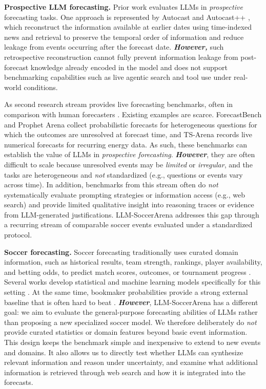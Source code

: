 \documentclass[sigconf,nonacm]{acmart}
\newcommand{\arena}{\mbox{LLM-SoccerArena}\xspace}
\begin{document}
\textbf{Prospective LLM forecasting.}
Prior work evaluates LLMs in \emph{prospective} forecasting tasks. One approach is represented by Autocast \citep{autocast} and Autocast++ \citep{autocastpp}, which reconstruct the information available at earlier dates using time-indexed news and retrieval to preserve the temporal order of information and reduce leakage from events occurring after the forecast date. \emph{\textbf{However,}} such retrospective reconstruction cannot fully prevent information leakage from post-forecast knowledge already encoded in the model and does not support benchmarking capabilities such as live agentic search and tool use under real-world conditions.

As second research stream provides live forecasting benchmarks, often in comparison with human forecasters \citep{halawi_etal_2024,pratt_etal_2024,hsieh_etal_2024}. Existing examples are scarce. ForecastBench \cite{forecastbench} and Prophet Arena  \citep{prophetarena} collect probabilistic forecasts for heterogeneous questions for which the outcomes are unresolved at forecast time, and TS-Arena \citep{tsarena} records live numerical forecasts for recurring energy data. As such, these benchmarks can establish the value of LLMs in \emph{prospective forecasting}. \textbf{\emph{However}}, they are often difficult to scale because unresolved events may be \emph{limited} or \emph{irregular}, and the tasks are heterogeneous and \emph{not} standardized (e.g., questions or events vary across time). In addition, benchmarks from this stream often do \emph{not} systematically evaluate prompting strategies or information access (e.g., web search) and provide limited qualitative insight into reasoning traces or evidence from LLM-generated justifications. \arena addresses this gap through a recurring stream of comparable soccer events evaluated under a standardized protocol.

\textbf{Soccer forecasting.}
Soccer forecasting traditionally uses curated domain information, such as historical results, team strength, rankings, player availability, and betting odds, to predict match scores, outcomes, or tournament progress \citep{maher_1982,dixon_coles_1997,groll_etal_2015,ley_etal_2019,zeileis_etal_2018}. Several works develop statistical and machine learning models specifically for this setting \cite{bunkerMachineLearningSoccer2024, rico-gonzalezMachineLearningApplication2022}. At the same time, bookmaker probabilities provide a strong external baseline that is often hard to beat \citep{leitner_etal_2010,sportsprediction}. \textbf{\emph{However}}, \arena has a different goal: we aim to evaluate the general-purpose forecasting abilities of LLMs rather than proposing a new specialized soccer model. We therefore deliberately do \emph{not} provide curated statistics or domain features beyond basic event information. This design keeps the benchmark simple and inexpensive to extend to new events and domains. It also allows us to directly test whether LLMs can synthesize relevant information and reason under uncertainty, and examine what additional information is retrieved through web search and how it is integrated into the forecasts.
\end{document}

